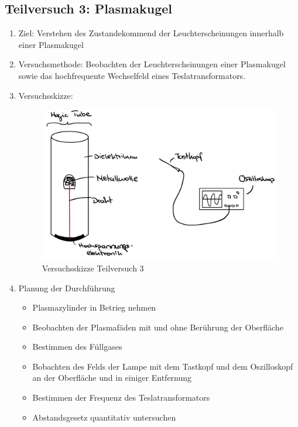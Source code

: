 \documentclass{article}
\begin{document}
\subsection{Teilversuch 3: Plasmakugel}
\begin{enumerate}[label = (\Roman*)]
    \item Ziel: Verstehen des Zustandekommend der Leuchterscheinungen innerhalb einer Plasmakugel
    
    \item Versuchsmethode: Beobachten der Leuchterscheinungen einer Plasmakugel sowie das hochfrequente Wechselfeld eines Teslatransformators.
    
    \item Versuchsskizze:
    
        \begin{figure}[H]
        \centering
        \includegraphics[width=0.7\linewidth]{Abbildungen/SkizzeTV3.jpeg}
        \caption{Versuchsskizze Teilversuch 3}
        \end{figure}

    \item Planung der Durchführung
        \begin{itemize}
           \item Plasmazylinder in Betrieg nehmen
           \item Beobachten der Plasmafäden mit und ohne Berührung der Oberfläche
           \item Bestimmen des Füllgases
           \item Bobachten des Felds der Lampe mit dem Tastkopf und dem Oszilloskopf an der Oberfläche und in einiger Entfernung
           \item Bestimmen der Frequenz des Teslatransformators
           \item Abstandsgesetz quantitativ untersuchen
        \end{itemize}


\end{enumerate}
\end{document}
